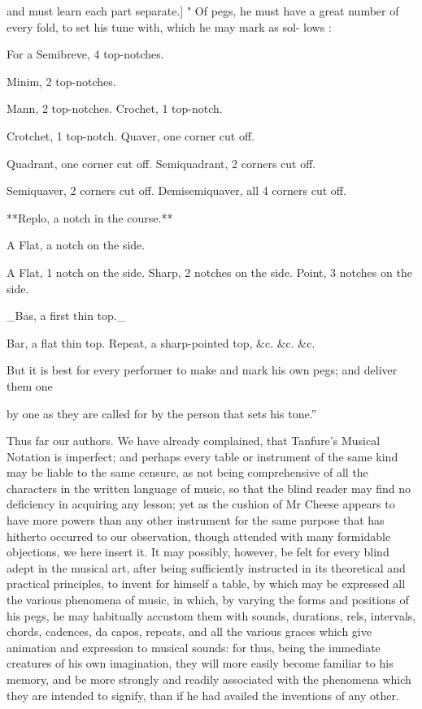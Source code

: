 \documentclass{article}
\begin{document}
and must learn each part separate.]
" Of pegs, he must have a great number of every
fold, to set his tune with, which he may mark as sol-
lows :

For a Semibreve, 4 top-notches.

Minim, 2 top-notches.

Mann, 2 top-notches.
Crochet, 1 top-notch.

Crotchet, 1 top-notch.
Quaver, one corner cut off.

Quadrant, one corner cut off.
Semiquadrant, 2 corners cut off.

Semiquaver, 2 corners cut off.
Demisemiquaver, all 4 corners cut off.

**Replo, a notch in the course.**

A Flat, a notch on the side.

A Flat, 1 notch on the side.
Sharp, 2 notches on the side.
Point, 3 notches on the side.

\_Bas, a first thin top.\_

Bar, a flat thin top.
Repeat, a sharp-pointed top, \&c. \&c. \&c.

But it is best for every performer to make and mark his own pegs; and deliver them one

by one as they are called for by the person that sets his tone.”

Thus far our authors. We have already complained, that Tanfure's Musical Notation is imperfect; and perhaps every table or instrument of the same kind may be liable to the same censure, as not being comprehensive of all the characters in the written language of music, so that the blind reader may find no deficiency in acquiring any lesson; yet as the cushion of Mr Cheese appears to have more powers than any other instrument for the same purpose that has hitherto occurred to our observation, though attended with many formidable objections, we here insert it. It may possibly, however, be felt for every blind adept in the musical art, after being sufficiently instructed in its theoretical and practical principles, to invent for himself a table, by which may be expressed all the various phenomena of music, in which, by varying the forms and positions of his pegs, he may habitually accustom them with sounds, durations, rels, intervals, chords, cadences, da capos, repeats, and all the various graces which give animation and expression to musical sounds: for thus, being the immediate creatures of his own imagination, they will more easily become familiar to his memory, and be more strongly and readily associated with the phenomena which they are intended to signify, than if he had availed the inventions of any other.
\end{document}
